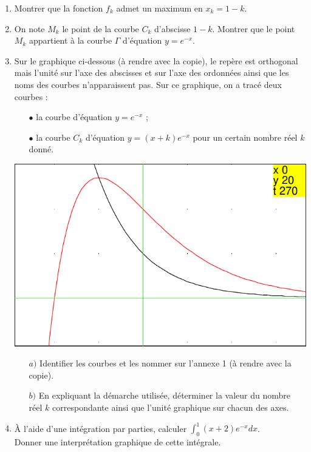 \documentclass[a4paper,11pt]{book}
\begin{document}
\begin{enumerate}    
\item Montrer que la fonction $f_k$ admet un maximum en $x_k=1-k$.
\item On note $M_k$ le point de la courbe $C_k$ d'abscisse $1-k$. Montrer que 
le point $M_k$ appartient \`a la courbe $\Gamma$ d'\'equation $y=e^{-x}$.
\item Sur le graphique ci-dessous (\`a rendre avec la copie), le 
rep\`ere est orthogonal mais l'unit\'e sur l'axe des abscisses et sur l'axe 
des ordonn\'ees ainsi que les noms des courbes n'apparaissent pas. Sur ce 
graphique, on a trac\'e deux courbes :
\begin{itemize}
     \item[$\bullet$] la courbe d'\'equation $y=e^{-x}$ ;
     \item[$ \bullet$] la courbe $C_k$ d'\'equation $y=(x+k)e^{-x}$ pour un 
certain nombre r\'eel $k$ donn\'e.
\end{itemize}
\includegraphics[width=\textwidth]{bactor2010}
\begin{itemize}
       \item[$a)$] Identifier les courbes et les nommer sur l'annexe 1 
(\`a rendre avec la copie).
      \item[$b)$] En expliquant la d\'emarche utilis\'ee, d\'eterminer la 
valeur du nombre r\'eel $k$ correspondante ainsi que l'unit\'e graphique sur 
chacun des axes.
\end{itemize}
\item  \`A l'aide d'une int\'egration par parties, calculer 
$\int_0^1(x+2)e^{-x}dx$.\\
 Donner une interpr\'etation graphique de cette int\'egrale.
\end{enumerate}
\end{document}
